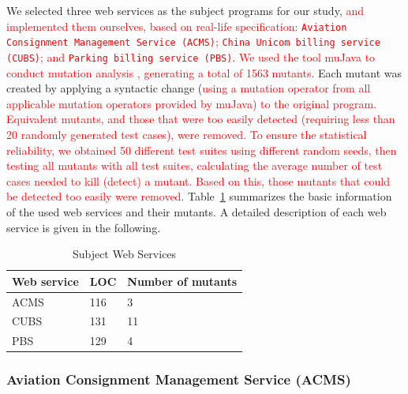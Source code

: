 \documentclass[10pt,journal,compsoc]{IEEEtran}
\begin{document}
We selected three web services as the subject programs for our study, \textcolor{red}{and implemented them ourselves, based on real-life specification:
\texttt{Aviation Consignment Management Service (ACMS)};
\texttt{China Unicom billing service (CUBS)}; and
\texttt{Parking billing service (PBS)}}. \textcolor{red}{
We used the tool muJava \cite{ma2005mujava} to conduct mutation analysis \cite{demillo1978hints, chen2018test, mao2017out, chen2017similarity}, generating a total of 1563 mutants}. Each mutant was created by applying a syntactic change (\textcolor{red}{using a mutation operator from all applicable mutation operators provided by muJava) to the original program. Equivalent mutants, and those that were too easily detected}
\textcolor{red}{(requiring less than 20 randomly generated test cases), were removed.}
\textcolor{red}{To ensure the statistical reliability, we obtained 50 different test suites using different random seeds, then testing all mutants with all test suites, calculating the average number of test cases needed to kill (detect) a mutant. Based on this, those mutants that could be detected too easily were removed.} Table~\ref{tab:objects} summarizes the basic information of the used web services and their mutants.
A detailed description of each web service is given in the following.

\begin{table}[h]
\caption{Subject Web Services}
\label{tab:objects}
\centering
\begin{tabular}{lll} \toprule
  Web service                            &LOC                            &Number of mutants    \\ \midrule
  ACMS                                   &116                            &3                                    \\
  CUBS                                   &131                            &11                                  \\
  PBS                                    &129                            &4                                   \\ \bottomrule
\end{tabular}

\end{table}

\subsubsection{Aviation Consignment Management Service (ACMS)}
\label{sec:acms}
\end{document}
